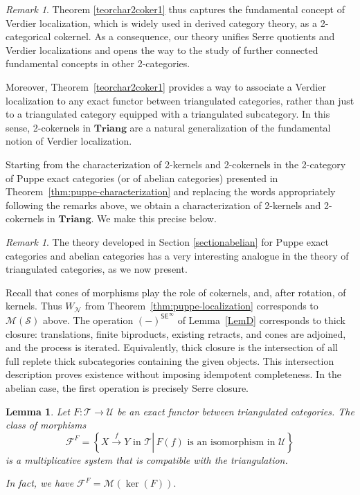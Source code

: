 \documentclass[11pt,reqno,a4paper]{amsart}
\newtheorem{lemma}[theorem]{Lemma}
\theoremstyle{definition}
\theoremstyle{remark}
\newtheorem{remark}[theorem]{Remark}
\def\nameit#1{\textrm{#1}~}
\def\thex{\nameit{Theorem}}
\newcommand{\N}{\mathcal{N}}
\newcommand{\T}{\mathcal{T}}
\renewcommand{\S}{\mathcal{S}}
\newcommand{\U}{\mathcal{U}}
\newcommand{\0}{\mathbf{0}}
\renewcommand{\1}{\mathbf{1}}
\newcommand{\Triang}{\mathbf{Triang}}
\def\:{\colon}
\def\set#1#2{\left\{{#1}\left.\right|\,{#2}\right\}}
\newcommand{\aar}[2][]{\xrightarrow[#1]{#2}}
\begin{document}
\begin{remark}
    Theorem \ref{teorchar2coker1} thus captures the fundamental concept of Verdier localization, which is widely used in derived category theory, as a 2-categorical cokernel. As a consequence, our theory unifies Serre quotients and Verdier localizations and opens the way to the study of further connected fundamental concepts in other 2-categories.

    Moreover, \thex\ref{teorchar2coker1} provides a way to associate a Verdier localization to any exact functor between triangulated categories, rather than just to a triangulated category equipped with a triangulated subcategory. In this sense, 2-cokernels in $\Triang$ are a natural generalization of the fundamental notion of Verdier localization.
\end{remark}

Starting from the characterization of 2-kernels and 2-cokernels in the 2-category of Puppe exact categories (or of abelian categories) presented in \thex\ref{thm:puppe-characterization} and replacing the words appropriately following the remarks above, we obtain a characterization of 2-kernels and 2-cokernels in $\Triang$. We make this precise below.

\begin{remark}
    The theory developed in Section \ref{sectionabelian} for Puppe exact categories and abelian categories has a very interesting analogue in the theory of triangulated categories, as we now present.

    Recall that cones of morphisms play the role of cokernels, and, after rotation, of kernels. Thus $W_{\N}$ from Theorem~\ref{thm:puppe-localization} corresponds to $\mathcal M(\S)$ above. The operation $(-)^{\mathsf{SE}^{\infty}}$ of Lemma~\ref{LemD} corresponds to thick closure: translations, finite biproducts, existing retracts, and cones are adjoined, and the process is iterated. Equivalently, thick closure is the intersection of all full replete thick subcategories containing the given objects. This intersection description proves existence without imposing idempotent completeness. In the abelian case, the first operation is precisely Serre closure.
\end{remark}

\begin{lemma}\label{lemmamultsystF}
    Let $F\: \T \to \U$ be an exact functor between triangulated categories. The class of morphisms $$\mathcal{F}^F=\set{X\aar{f} Y \text{ in }\T}{F(f) \text{ is an isomorphism in }\U}$$
    is a multiplicative system that is compatible with the triangulation.

    In fact, we have $\mathcal{F}^F=\mathcal{M}(\ker(F)).$
\end{lemma}
\end{document}
